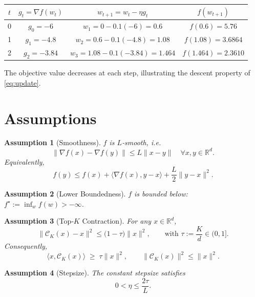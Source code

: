 \documentclass{article}
\newtheorem{assumption}{Assumption}
\newcommand{\R}{\mathbb{R}}
\begin{document}
\begin{center}
\begin{tabular}{c|c|c|c}
$t$ & $g_{t}=\nabla f(w_{t})$ & $w_{t+1}=w_{t}-\eta g_{t}$ & $f(w_{t+1})$\\ \hline
0 & $g_{0}= -6$ & $w_{1}=0-0.1(-6)=0.6$ & $f(0.6)=5.76$\\
1 & $g_{1}= -4.8$ & $w_{2}=0.6-0.1(-4.8)=1.08$ & $f(1.08)=3.6864$\\
2 & $g_{2}= -3.84$ & $w_{3}=1.08-0.1(-3.84)=1.464$ & $f(1.464)=2.3610$
\end{tabular}
\end{center}
The objective value decreases at each step, illustrating the descent
property of \eqref{eq:update}.

\newpage
\section*{Assumptions}
\begin{assumption}[Smoothness]\label{as:smooth}
$f$ is $L$‑smooth, i.e.
\[
\|\nabla f(x)-\nabla f(y)\| \le L\|x-y\|\quad\forall x,y\in\R^{d}.
\]
Equivalently,
\[
f(y)\le f(x)+\langle\nabla f(x),y-x\rangle+\frac{L}{2}\|y-x\|^{2}.
\]
\end{assumption}

\begin{assumption}[Lower Boundedness]\label{as:lb}
$f$ is bounded below: $f^{\star}:=\inf_{w}f(w)>-\infty$.
\end{assumption}

\begin{assumption}[Top‑$K$ Contraction]\label{as:topk}
For any $x\in\R^{d}$,
\[
\|\mathcal{C}_{K}(x)-x\|^{2}\le\bigl(1-\tau\bigr)\|x\|^{2},
\qquad\text{with }\tau:=\frac{K}{d}\in(0,1].
\tag{A3}
\]
Consequently,
\[
\langle x,\mathcal{C}_{K}(x)\rangle\;\ge\;\tau\|x\|^{2},
\qquad
\|\mathcal{C}_{K}(x)\|^{2}\le\|x\|^{2}.
\tag{A3'}
\]
\end{assumption}

\begin{assumption}[Stepsize]\label{as:step}
The constant stepsize satisfies
\[
0<\eta\le\frac{2\tau}{L}.
\tag{A4}
\]
\end{assumption}
\end{document}
